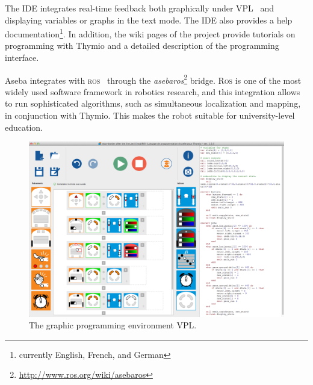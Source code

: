 \documentclass[letterpaper, 10 pt, conference]{ieeeconf}  %
\begin{document}

The IDE integrates real-time feedback both graphically under VPL~\cite{Magnenat2015} and displaying variables or graphs in the text mode.
The IDE also provides a help documentation\footnote{currently English, French, and German}.
In addition, the wiki pages of the project provide tutorials on programming with Thymio and a detailed description of the programming interface.

Aseba integrates with \textsc{ros}~\cite{quigley2009ros} through the \emph{asebaros}\footnote{\url{http://www.ros.org/wiki/asebaros}} bridge.
\textsc{Ros} is one of the most widely used software framework in robotics research, and this integration allows to run sophisticated algorithms, such as simultaneous localization and mapping, in conjunction with  Thymio.
This makes the robot suitable for university-level education.

\begin{figure}
\centering
\includegraphics[width=.9\columnwidth]{figures/vpl}
\caption{The graphic programming environment VPL.}
\label{fig:vpl}
\end{figure}
\end{document}
